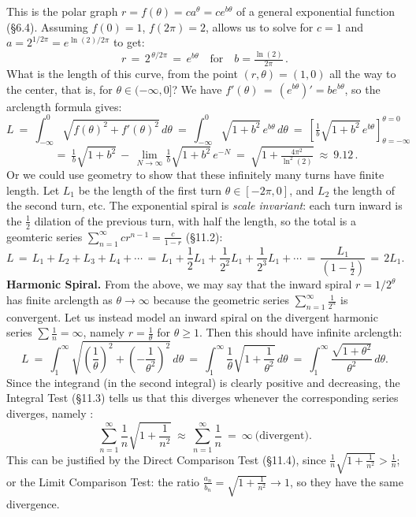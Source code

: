 \documentclass[11pt]{article}
\begin{document}
\noindent
This is the polar graph  $r = f(\theta)=ca^\theta=ce^{b\theta}$
of a general exponential function (\S6.4). 
Assuming $f(0)=1$, $f(2\pi)=2$, allows us to solve 
for $c=1$ and $a= 2^{1/2\pi} =e^{\ln(2)/2\pi}$ to get:
$$
r\,=\,2^{\,\theta/2\pi} \,=\, e^{b\theta}
\quad\text{for}\quad b=\tfrac{\ln(2)}{2\pi}\,.
$$
What is the length of this curve, from the point $(r,\theta)=(1,0)$ all the way to the center,
that is, for $\theta\in (-\infty,0]$? 
We have $f'(\theta)  \,=\, (e^{b\theta})' = be^{b\theta}$, so
the arclength formula gives:
$$
L 
\ = \ 
\int_{-\infty}^0\!\!\!\! \sqrt{f(\theta)^2 + f'(\theta)^2}\,d\theta
\ = \ 
\int_{-\infty}^0\!\!\!\! \sqrt{1{+}b^2}\, e^{b\theta}\,d\theta
\ = \ 
\left[ \tfrac1b\sqrt{1{+}b^2}\, e^{b\theta}\right]_{\theta=-\infty}^{\theta=0}
$$
$$
\ = \ 
\tfrac1b\sqrt{1{+}b^2} \,-\, \lim_{N\to\infty} \tfrac1b\sqrt{1{+}b^2}\, e^{-N}
\ =\
\sqrt{1{+}\tfrac{4\pi^2}{\ln^2(2)}} \ \approx\ 9.12\,.
$$
Or we could use geometry to show that these infinitely many turns have finite length. 
Let $L_1$ be the length of the first turn $\theta\in[-2\pi,0]$, and $L_2$ the length of the second turn, etc. 
The exponential spiral is {\it scale invariant}: 
each turn inward is the $\frac12$ dilation of the previous turn,
with half the length, so the total is a geomteric series 
$\sum_{n=1}^\infty cr^{n-1} = \frac c{1-r}$ (\S11.2):
$$
L \,=\, L_1 +L_2+L_3+L_4+\cdots
\,=\,  L_1+\frac12 L_1 +\frac1{2^2}L_1+\frac1{2^3}L_1+\cdots
\,=\, \frac{L_1}{(1-\frac12)} \,=\, 2L_1.
$$
{\bf Harmonic Spiral.} From the above, we may say that the inward spiral $r=1/2^{\theta}$ 
 has finite arclength as $\theta\to\infty$ because the geometric series 
 $\sum_{n=1}^\infty \frac1{2^n}$ is  convergent.
Let us instead model an inward spiral on the divergent harmonic series $\sum\frac1n=\infty$, 
namely $r=\frac1{\theta}$ for $\theta\geq 1$. Then this should have infinite arclength:
$$\textstyle
L \ =\ \int_1^{\infty} \sqrt{(\frac{1}{\theta})^2+(-\frac{1}{\theta^2})^2}\,d\theta
\ =\ \int_1^{\infty} \frac{1}{\theta}\sqrt{1+\frac{1}{\theta^2}}\,d\theta
\ =\ \int_1^{\infty} \frac{\sqrt{1+\theta^2}}{\theta^2}\,d\theta.
$$
Since the integrand (in the second integral) is clearly positive and decreasing, the Integral Test  (\S11.3) 
tells us that this diverges whenever the corresponding series diverges, namely :
$$\textstyle
\sum_{n=1}^\infty  \frac{1}{n}\sqrt{1+\frac{1}{n^2}}
\  \approx\  \sum_{n=1}^\infty  \frac{1}{n} \ = \ \infty\  \text{(divergent)}.
$$
This can be justified by the Direct Comparison Test (\S11.4), since 
$\tfrac{1}{n}\sqrt{1{+}\tfrac{1}{n^2}}>\tfrac{1}{n}$; or 
the Limit Comparison Test: the ratio $\frac{a_n}{b_n}=\sqrt{1{+}\tfrac{1}{n^2}}\to 1$, 
so they have the same divergence.
\end{document}
